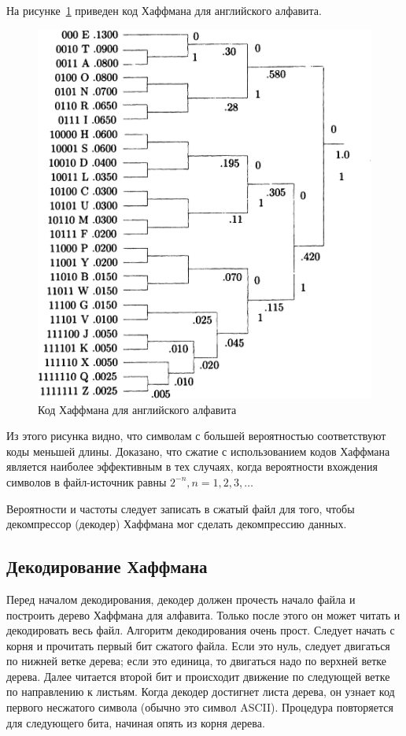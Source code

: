 На рисунке~\ref{pic:huffman_en} приведен код Хаффмана для английского алфавита.

\begin{figure}[h]
  \centering
  \includegraphics[width=150mm]{pic/huffman_en.jpg}
  \caption{Код Хаффмана для английского алфавита}
  \label{pic:huffman_en}
\end{figure}

Из этого рисунка видно, что символам с большей вероятностью соответствуют
коды меньшей длины. Доказано, что сжатие с использованием кодов Хаффмана
является наиболее эффективным в тех случаях, когда вероятности вхождения символов
в файл-источник равны $ 2^{-n}, n=1,2,3,\dots $ 

Вероятности и частоты следует записать в сжатый файл для того,
чтобы декомпрессор (декодер) Хаффмана мог сделать декомпрессию данных.

\subsection{Декодирование Хаффмана}

Перед началом декодирования, декодер должен прочесть начало 
файла и построить дерево Хаффмана для алфавита.
Только после этого он может читать и декодировать весь файл.
Алгоритм декодирования очень прост.
Следует начать с корня и прочитать первый бит сжатого файла.
Если это нуль, следует двигаться по нижней ветке дерева;
если это единица, то двигаться надо по верхней ветке дерева.
Далее читается второй бит и происходит движение по следующей
ветке по направлению к листьям. Когда декодер достигнет листа
дерева, он узнает код первого несжатого символа 
(обычно это символ ASCII).
Процедура повторяется для следующего бита, начиная опять из корня дерева.

